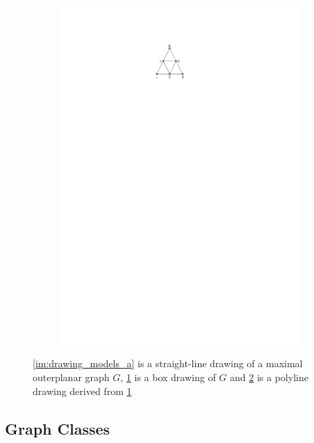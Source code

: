 \begin{figure}[H]
\begin{subfigure}{0.4\textwidth}
	\caption{}\label{im:drawing_models_b}
\end{subfigure}
\begin{subfigure}{0.4\textwidth}
	\centering
	\includegraphics[page=3,width=\linewidth]{graphics/preliminaries_drawing_models.pdf}
	\caption{}\label{im:drawing_models_c}
\end{subfigure}
	\caption{\ref{im:drawing_models_a} is a straight-line drawing of a maximal outerplanar graph $G$, \ref{im:drawing_models_b} is a box drawing of $G$ and \ref{im:drawing_models_c} is a polyline drawing derived from \ref{im:drawing_models_b}}\label{im:drawing_models}
\end{figure}

\subsection{Graph Classes}
